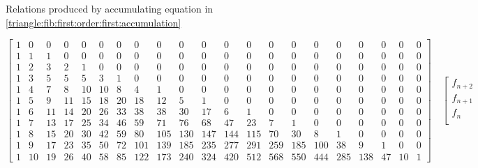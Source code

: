 \documentclass[a4paper,dottedtoc,headinclude,footinclude]{report} %
\theoremstyle{plain}
\begin{document}
\begin{table}
        \caption{Relations produced by accumulating equation in 
            \autoref{triangle:fib:first:order:first:accumulation}}
        \label{triangle:fib:first:order:second:accumulation}
    \end{table}

    \begin{table}
        \begin{displaymath}
            \left[
                \begin{array}{ccccccccccccccccccccc}
                    1 & 0 & 0 & 0 & 0 & 0 & 0 & 0 & 0 & 0 & 0 & 0 & 0 & 0 & 0 & 0 & 0 & 0 & 0 & 0 & 0\\
                    1 & 1 & 1 & 0 & 0 & 0 & 0 & 0 & 0 & 0 & 0 & 0 & 0 & 0 & 0 & 0 & 0 & 0 & 0 & 0 & 0\\
                    1 & 2 & 3 & 2 & 1 & 0 & 0 & 0 & 0 & 0 & 0 & 0 & 0 & 0 & 0 & 0 & 0 & 0 & 0 & 0 & 0\\
                    1 & 3 & 5 & 5 & 5 & 3 & 1 & 0 & 0 & 0 & 0 & 0 & 0 & 0 & 0 & 0 & 0 & 0 & 0 & 0 & 0\\
                    1 & 4 & 7 & 8 & 10 & 10 & 8 & 4 & 1 & 0 & 0 & 0 & 0 & 0 & 0 & 0 & 0 & 0 & 0 & 0 & 0\\
                    1 & 5 & 9 & 11 & 15 & 18 & 20 & 18 & 12 & 5 & 1 & 0 & 0 & 0 & 0 & 0 & 0 & 0 & 0 & 0 & 0\\
                    1 & 6 & 11 & 14 & 20 & 26 & 33 & 38 & 38 & 30 & 17 & 6 & 1 & 0 & 0 & 0 & 0 & 0 & 0 & 0 & 0\\
                    1 & 7 & 13 & 17 & 25 & 34 & 46 & 59 & 71 & 76 & 68 & 47 & 23 & 7 & 1 & 0 & 0 & 0 & 0 & 0 & 0\\
                    1 & 8 & 15 & 20 & 30 & 42 & 59 & 80 & 105 & 130 & 147 & 144 & 115 & 70 & 30 & 8 & 1 & 0 & 0 & 0 & 0\\
                    1 & 9 & 17 & 23 & 35 & 50 & 72 & 101 & 139 & 185 & 235 & 277 & 291 & 259 & 185 & 100 & 38 & 9 & 1 & 0 & 0\\
                    1 & 10 & 19 & 26 & 40 & 58 & 85 & 122 & 173 & 240 & 324 & 420 & 512 & 568 & 550 & 444 & 285 & 138 & 47 & 10 & 1
                \end{array}
                \right]  \quad %
                \left[
                    \begin{array}{c}
                        f_{n + 2}\\
                        f_{n + 1}\\
                        f_{n}\\

\end{array}
\end{displaymath}
\end{table}
\end{document}
